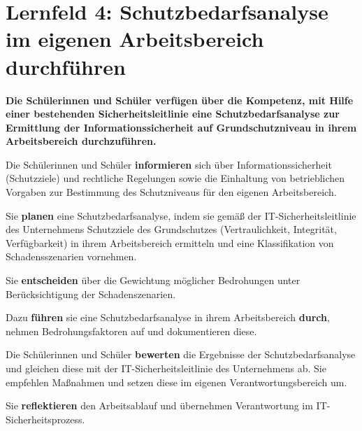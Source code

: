 \chapter{Lernfeld 4: Schutzbedarfsanalyse im eigenen Arbeitsbereich durchführen}

\textbf{Die Schülerinnen und Schüler verfügen über die Kompetenz, mit Hilfe einer bestehenden Sicherheitsleitlinie eine Schutzbedarfsanalyse zur Ermittlung der Informationssicherheit auf Grundschutzniveau in ihrem Arbeitsbereich durchzuführen.}

Die Schülerinnen und Schüler \textbf{informieren} sich über Informationssicherheit (Schutzziele)
und rechtliche Regelungen sowie die Einhaltung von betrieblichen Vorgaben zur Bestimmung des Schutzniveaus für den eigenen Arbeitsbereich.

Sie \textbf{planen} eine Schutzbedarfsanalyse, indem sie gemäß der IT-Sicherheitsleitlinie des Unternehmens Schutzziele des Grundschutzes (Vertraulichkeit, Integrität, Verfügbarkeit) in ihrem Arbeitsbereich ermitteln und eine Klassifikation von Schadensszenarien vornehmen.

Sie \textbf{entscheiden} über die Gewichtung möglicher Bedrohungen unter Berücksichtigung der
Schadenszenarien.

Dazu \textbf{führen} sie eine Schutzbedarfsanalyse in ihrem Arbeitsbereich \textbf{durch}, nehmen Bedrohungsfaktoren auf und dokumentieren diese.


Die Schülerinnen und Schüler \textbf{bewerten} die Ergebnisse der Schutzbedarfsanalyse und gleichen diese mit der IT-Sicherheitsleitlinie des Unternehmens ab. Sie empfehlen Maßnahmen
und setzen diese im eigenen Verantwortungsbereich um.

Sie \textbf{reflektieren} den Arbeitsablauf und übernehmen Verantwortung im IT-Sicherheitsprozess.

